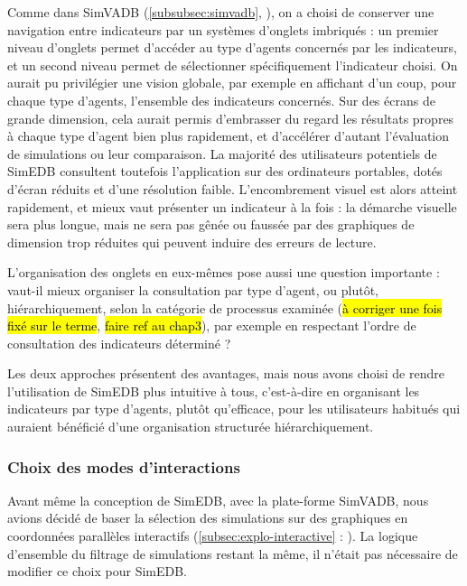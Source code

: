 			Comme dans SimVADB (\cref{subsubsec:simvadb}, ), on a choisi de conserver une navigation entre indicateurs par un systèmes d'onglets imbriqués : un premier niveau d'onglets permet d'accéder au type d'agents concernés par les indicateurs, et un second niveau permet de sélectionner spécifiquement l'indicateur choisi.
			On aurait pu privilégier une vision globale, par exemple en affichant d'un coup, pour chaque type d'agents, l'ensemble des indicateurs concernés.
			Sur des écrans de grande dimension, cela aurait permis d'embrasser du regard les résultats propres à chaque type d'agent bien plus rapidement, et d'accélérer d'autant l'évaluation de simulations ou leur comparaison.
			La majorité des utilisateurs potentiels de SimEDB consultent toutefois l'application sur des ordinateurs portables, dotés d'écran réduits et d'une résolution faible.
			L'encombrement visuel est alors atteint rapidement, et mieux vaut présenter un indicateur à la fois : la démarche visuelle sera plus longue, mais ne sera pas gênée ou faussée par des graphiques de dimension trop réduites qui peuvent induire des erreurs de lecture.
			
			L'organisation des onglets en eux-mêmes pose aussi une question importante : vaut-il mieux organiser la consultation par type d'agent, ou plutôt, hiérarchiquement, selon la catégorie de processus examinée (\hl{à corriger une fois fixé sur le terme}, \hl{faire ref au chap3}), par exemple en respectant l'ordre de consultation des indicateurs déterminé ?
			
			Les deux approches présentent des avantages, mais nous avons choisi de rendre l'utilisation de SimEDB plus intuitive à tous, c'est-à-dire en organisant les indicateurs par type d'agents, plutôt qu'efficace, pour les utilisateurs habitués qui auraient bénéficié d'une organisation structurée hiérarchiquement.
			
		\subsubsection{Choix des modes d'interactions}
		
			Avant même la conception de SimEDB, avec la plate-forme SimVADB, nous avions décidé de baser la sélection des simulations sur des graphiques en coordonnées parallèles interactifs (\cref{subsec:explo-interactive} : ).
			La logique d'ensemble du filtrage de simulations restant la même, il n'était pas nécessaire de modifier ce choix pour SimEDB.
			
